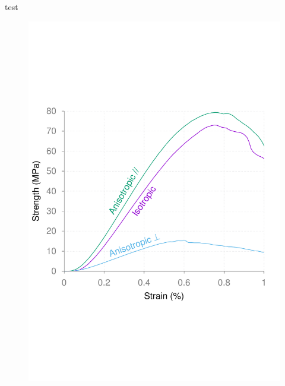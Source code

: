 \documentclass{article}
\begin{document}
	test
	\begin{figure}[ht]
		\centering
		\includegraphics[width=\linewidth]{figures/sup_fig1.pdf}
	\end{figure}
\end{document}
